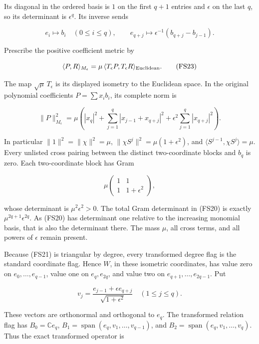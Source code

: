 Its diagonal in the ordered basis is \(1\) on the first \(q+1\) entries and \(\epsilon\) on the last \(q\), so its determinant is \(\epsilon^q\). Its inverse sends

\[
e_i\longmapsto b_i\quad(0\le i\le q),\qquad
e_{q+j}\longmapsto\epsilon^{-1}(b_{q+j}-b_{j-1}).
\tag{FS22}
\]

Prescribe the positive coefficient metric by

\[
\langle P,R\rangle_{M_\epsilon}
=\mu\,\langle T_\epsilon P,T_\epsilon R\rangle_{\rm Euclidean}.
\tag{FS23}
\]

The map \(\sqrt\mu\,T_\epsilon\) is its displayed isometry to the Euclidean space. In the original polynomial coefficients \(P=\sum x_i b_i\), its complete norm is

\[
\boxed{
\|P\|_{M_\epsilon}^2
=\mu\left(|x_q|^2+
\sum_{j=1}^q|x_{j-1}+x_{q+j}|^2+
\epsilon^2\sum_{j=1}^q|x_{q+j}|^2\right).
}
\tag{FS24}
\]

In particular \(\|1\|^2=\|\chi\|^2=\mu\), \(\|\chi S^j\|^2=\mu(1+\epsilon^2)\), and \(\langle S^{j-1},\chi S^j\rangle=\mu\). Every unlisted cross pairing between the distinct two-coordinate blocks and \(b_q\) is zero. Each two-coordinate block has Gram

\[
\mu\begin{pmatrix}1&1\\1&1+\epsilon^2\end{pmatrix},
\tag{FS25}
\]

whose determinant is \(\mu^2\epsilon^2>0\). The total Gram determinant in (FS20) is exactly \(\mu^{2q+1}\epsilon^{2q}\). As (FS20) has determinant one relative to the increasing monomial basis, that is also the determinant there. The mass \(\mu\), all cross terms, and all powers of \(\epsilon\) remain present.

Because (FS21) is triangular by degree, every transformed degree flag is the standard coordinate flag. Hence \(W\), in these isometric coordinates, has value zero on \(e_0,\ldots,e_{q-1}\), value one on \(e_q,e_{2q}\), and value two on \(e_{q+1},\ldots,e_{2q-1}\). Put

\[
v_j=\frac{e_{j-1}+\epsilon e_{q+j}}{\sqrt{1+\epsilon^2}}
\quad(1\le j\le q).
\tag{FS26}
\]

These vectors are orthonormal and orthogonal to \(e_q\). The transformed relation flag has \(B_0=\mathbb C e_q\), \(B_1=\operatorname{span}(e_q,v_1,\ldots,v_{q-1})\), and \(B_2=\operatorname{span}(e_q,v_1,\ldots,v_q)\). Thus the exact transformed operator is

